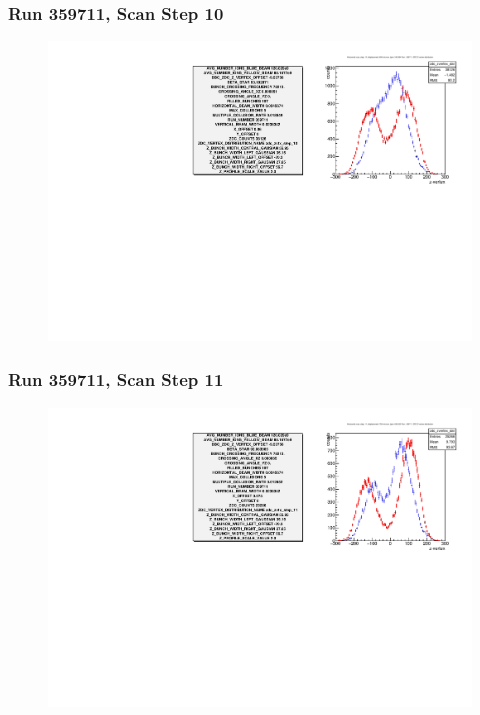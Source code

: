 \begin{frame}
\frametitle{Run 359711, Scan Step 10}
\begin{figure}
\begin{center}
\includegraphics[width=\linewidth]{"figures/359711_step_10_zdc_zvertex"}
\caption{ }
\label{fig:359711_step_10_zdc_zvertex}
\end{center}\end{figure}
\end{frame}

\begin{frame}
\frametitle{Run 359711, Scan Step 11}
\begin{figure}
\begin{center}
\includegraphics[width=\linewidth]{"figures/359711_step_11_zdc_zvertex"}
\caption{ }
\label{fig:359711_step_11_zdc_zvertex}
\end{center}\end{figure}
\end{frame}

